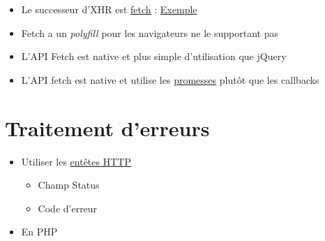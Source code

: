 \begin{itemize}
\tightlist
\item
  Le successeur d'XHR est \href{https://fetch.spec.whatwg.org/}{fetch} :
  \href{https://developer.mozilla.org/fr/docs/Web/API/Fetch_API/Using_Fetch}{Exemple}
\item
  Fetch a un \emph{polyfill} pour les navigateurs ne le supportant pas
\item
  L'API Fetch est native et plus simple d'utilisation que jQuery
\end{itemize}

\begin{english}

\begin{Shaded}
\begin{Highlighting}[]
\NormalTok{(}\NormalTok{)}
    \NormalTok{(}
        \NormalTok{()}
\NormalTok{    \})}
    \NormalTok{(}
        \OperatorTok{;}
\NormalTok{    \})}
    \NormalTok{(}
        \NormalTok{(}\OperatorTok{,}
\NormalTok{    \})}
\end{Highlighting}
\end{Shaded}

\end{english}

\begin{itemize}
\tightlist
\item
  L'API fetch est native et utilise les
  \href{https://www.promisejs.org/}{promesses} plutôt que les callbacks
\end{itemize}

\hypertarget{traitement-derreurs}{%
\section{Traitement d'erreurs}\label{traitement-derreurs}}

\begin{itemize}
\tightlist
\item
  Utiliser les
  \href{https://www.bennadel.com/blog/1860-using-appropriate-status-codes-with-each-api-response.htm}{entêtes
  HTTP}

  \begin{itemize}
  \tightlist
  \item
    Champ Status
  \item
    Code d'erreur
  \end{itemize}
\item
  En PHP
\end{itemize}

